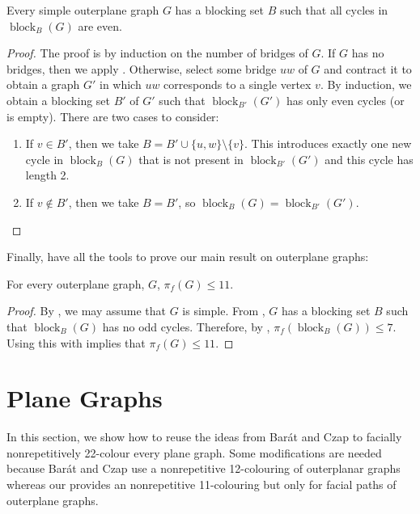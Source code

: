 \documentclass{patmorin}
\DeclareMathOperator{\block}{block}
\begin{document}
\begin{lem}
  Every simple outerplane graph $G$ has a blocking set $B$ such that
  all cycles in $\block_B(G)$ are even.
\end{lem}

\begin{proof}
  The proof is by induction on the number of bridges of $G$.  If $G$
  has no bridges, then we apply .  Otherwise,
  select some bridge $uw$ of $G$ and contract it to obtain a graph $G'$
  in which $uw$ corresponds to a single vertex $v$.  By induction,
  we obtain a blocking set $B'$ of $G'$ such that $\block_{B'}(G')$
  has only even cycles (or is empty).  There are two cases to consider:
  \begin{enumerate}
    \item If $v\in B'$, then we take $B=B'\cup\{u,w\}\setminus\{v\}$. This introduces exactly one new cycle in $\block_B(G)$ that is not present in $\block_{B'}(G')$ and this cycle has length 2.

    \item If $v\not\in B'$, then we take $B=B'$, so
    $\block_B(G)=\block_{B'}(G')$. \qedhere
  \end{enumerate}
\end{proof}

Finally, have all the tools to prove our main result on outerplane graphs:

\begin{thm}
  For every outerplane graph, $G$, $\pi_f(G)\le 11$.
\end{thm}

\begin{proof}
By , we may assume that $G$ is simple.  From
, $G$ has a blocking set $B$ such that $\block_B(G)$
has no odd cycles.  Therefore, by , $\pi_f(\block_B(G))\le
7$.  Using this with  implies that $\pi_f(G)\le 11$.
\end{proof}



\section{Plane Graphs}

In this section, we show how to reuse the ideas from Bar\'at and Czap
\cite{barat2013facial} to facially nonrepetitively 22-colour every plane graph.
Some modifications are needed because Bar\'at and Czap use a nonrepetitive
12-colouring of outerplanar graphs whereas our  provides an
nonrepetitive 11-colouring but only for facial paths of outerplane graphs.
\end{document}
